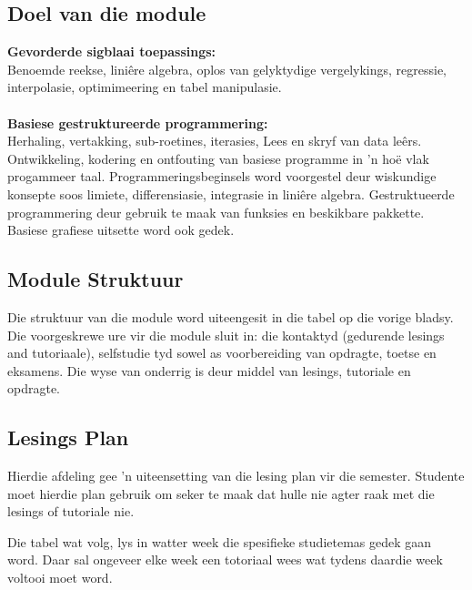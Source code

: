     \subsection{Doel van die module}
        {\bf Gevorderde sigblaai toepassings:} \\
        Benoemde reekse, lini\^{e}re algebra,
        oplos van gelyktydige vergelykings, regressie, interpolasie,
        optimimeering en tabel manipulasie. \\ \\
        
        {\bf Basiese gestruktureerde programmering:} \\
        Herhaling, vertakking, sub-roetines, iterasies, Lees en skryf van data le\^{e}rs.
        Ontwikkeling, kodering en ontfouting van basiese programme in 'n ho\"{e} vlak
        progammeer taal. Programmeringsbeginsels word voorgestel deur wiskundige 
        konsepte soos limiete, differensiasie, integrasie in lini\^{e}re algebra. 
        Gestruktueerde programmering deur gebruik te maak van funksies en 
        beskikbare pakkette.  Basiese grafiese uitsette word ook gedek.
    
    \subsection{Module Struktuur}
	Die struktuur van die module word uiteengesit in die tabel op die vorige bladsy.
	Die voorgeskrewe ure vir die module sluit in: die kontaktyd (gedurende lesings and tutoriaale),
	selfstudie tyd sowel as voorbereiding van opdragte, toetse en 
	eksamens. Die wyse van onderrig is deur middel van lesings, tutoriale en opdragte.

    \subsection{Lesings Plan}
	Hierdie afdeling gee 'n uiteensetting van die lesing plan vir die semester.  Studente
	moet hierdie plan gebruik om seker te maak dat hulle nie agter raak met die
	lesings of tutoriale nie.
	
	Die tabel wat volg, lys in watter week die spesifieke studietemas gedek gaan word.
	Daar sal ongeveer elke week een totoriaal wees wat tydens daardie week voltooi moet word.
        
